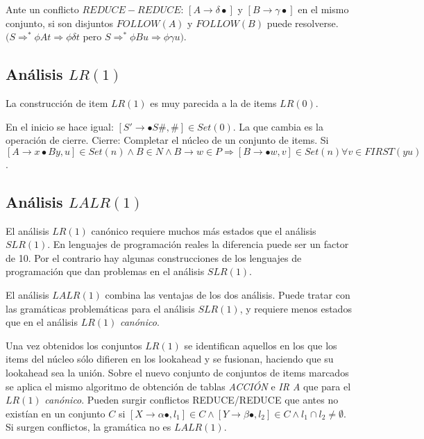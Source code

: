 Ante un conflicto $REDUCE-REDUCE$: $[A\rightarrow\delta\bullet ]$ y $[B\rightarrow\gamma\bullet ]$ en el mismo conjunto, si son disjuntos $FOLLOW(A)$ y $FOLLOW(B)$ puede resolverse.$(S \Rightarrow^{*}\phi At \Rightarrow\phi\delta t$ pero $S \Rightarrow^*\phi Bu \Rightarrow\phi\gamma u)$.

\subsection{Análisis $LR(1)$}

La construcción de item $LR(1)$ es muy parecida a la de items $LR(0)$.

En el inicio se hace igual:
$[S'\rightarrow \bullet S\#,\#]\in Set(0)$.
La que cambia es la operación de cierre.
Cierre: Completar el núcleo de un conjunto de items.
Si $[A \rightarrow x\bullet By, u]\in Set(n) \wedge B\in N\wedge B\rightarrow w \in P \Rightarrow[B \rightarrow\bullet w,v]\in Set(n) \forall v \in FIRST(yu)$.


\subsection{Análisis $LALR(1)$}

El análisis $LR(1)$ canónico requiere muchos más estados que el análisis $SLR(1)$. En lenguajes de programación reales la diferencia puede ser un factor de 10. Por el contrario hay algunas construcciones de los lenguajes de programación que dan problemas en el análisis $SLR(1)$.

El análisis $LALR(1)$ combina las ventajas de los dos análisis. Puede tratar con las gramáticas problemáticas para el análisis $SLR(1)$, y requiere menos estados que en el análisis $LR(1)$ \textit{canónico}.

Una vez obtenidos los conjuntos $LR(1)$ se identifican aquellos en los que los items del núcleo sólo difieren en los lookahead y se fusionan, haciendo que su lookahead sea la unión.
Sobre el nuevo conjunto de conjuntos de items marcados se aplica el mismo algoritmo de obtención de tablas \textit{ACCIÓN} e \textit{IR A} que para el $LR(1)$ \textit{canónico}.
Pueden surgir conflictos REDUCE/REDUCE que antes no existían en un conjunto $C$ si
$ [X\rightarrow \alpha\bullet ,l_{1} ]\in C \wedge [Y\rightarrow\beta\bullet ,l_{2}]\in C \wedge l_{1}\cap  l_{2}\neq\emptyset$.
Si surgen conflictos, la gramática no es $LALR(1)$.

